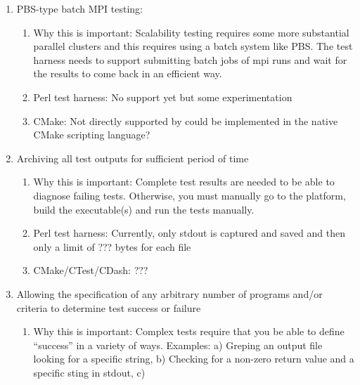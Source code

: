 \documentclass[pdf,ps2pdf,11pt]{SANDreport}
\begin{document}
\begin{enumerate}
\begin{enumerate}
\begin{enumerate}
    \end{enumerate}

  {}\item PBS-type batch MPI testing:

    \begin{enumerate}

    {}\item Why this is important: Scalability testing requires some
    more substantial parallel clusters and this requires using a batch
    system like PBS.  The test harness needs to support submitting
    batch jobs of mpi runs and wait for the results to come back in an
    efficient way.

    {}\item Perl test harness: No support yet but some experimentation

    {}\item CMake: Not directly supported by could be implemented in
    the native CMake scripting language?

    \end{enumerate}

  {}\item Archiving all test outputs for sufficient period of time

    \begin{enumerate}

    {}\item Why this is important: Complete test results are needed to
    be able to diagnose failing tests.  Otherwise, you must manually
    go to the platform, build the executable(s) and run the tests
    manually.

    {}\item Perl test harness: Currently, only stdout is captured and
    saved and then only a limit of ??? bytes for each file

    {}\item CMake/CTest/CDash: ???

    \end{enumerate}

  {}\item Allowing the specification of any arbitrary number of
  programs and/or criteria to determine test success or failure

    \begin{enumerate}

    {}\item Why this is important: Complex tests require that you be
    able to define ``success'' in a variety of ways.  Examples: a)
    Greping an output file looking for a specific string, b) Checking
    for a non-zero return value and a specific sting in stdout, c)


\end{enumerate}
\end{enumerate}
\end{enumerate}
\end{document}
